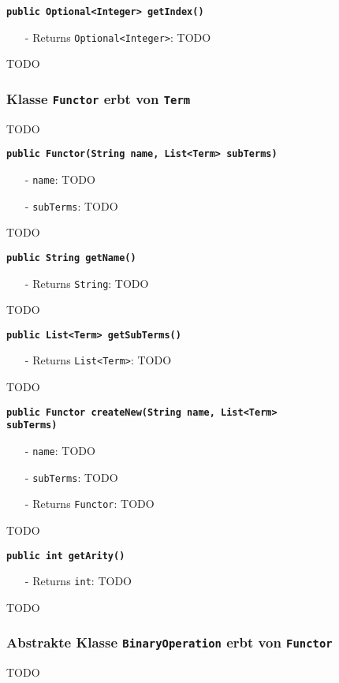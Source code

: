 \documentclass[parskip=full,11pt,twoside]{scrartcl}
\begin{document}
\textbf{\texttt{public Optional<Integer> getIndex()}}
\begin{itemize}[noitemsep]
	\item[-] Returns \texttt{Optional<Integer>}: TODO
\end{itemize}
TODO

\subsubsection{Klasse \texttt{Functor} erbt von \texttt{Term}}
TODO

\textbf{\texttt{public Functor(String name, List<Term> subTerms)}}
\begin{itemize}[noitemsep]
	\item[-] \texttt{name}: TODO
	\item[-] \texttt{subTerms}: TODO
\end{itemize}
TODO

\textbf{\texttt{public String getName()}}
\begin{itemize}[noitemsep]
	\item[-] Returns \texttt{String}: TODO
\end{itemize}
TODO

\textbf{\texttt{public List<Term> getSubTerms()}}
\begin{itemize}[noitemsep]
	\item[-] Returns \texttt{List<Term>}: TODO
\end{itemize}
TODO

\textbf{\texttt{public Functor createNew(String name, List<Term>\\subTerms)}}
\begin{itemize}[noitemsep]
	\item[-] \texttt{name}: TODO
	\item[-] \texttt{subTerms}: TODO
	\item[-] Returns \texttt{Functor}: TODO
\end{itemize}
TODO

\textbf{\texttt{public int getArity()}}
\begin{itemize}[noitemsep]
	\item[-] Returns \texttt{int}: TODO
\end{itemize}
TODO

\subsubsection{Abstrakte Klasse \texttt{BinaryOperation} erbt von \texttt{Functor}}
TODO
\end{document}
